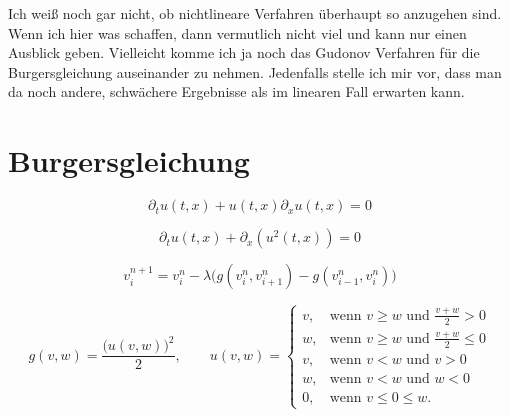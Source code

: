 Ich weiß noch gar nicht, ob nichtlineare Verfahren überhaupt so anzugehen sind.
Wenn ich hier was schaffen, dann vermutlich nicht viel und kann nur einen Ausblick geben.
Vielleicht komme ich ja noch das Gudonov Verfahren für die Burgersgleichung auseinander zu nehmen.
Jedenfalls stelle ich mir vor, dass man da noch andere, schwächere Ergebnisse als im linearen Fall erwarten kann.

\section{Burgersgleichung}

\[ \partial_t u(t, x) + u(t,x) \partial_x u(t,x) = 0 \]

\[ \partial_t u(t, x) + \partial_x \left(u^2(t,x) \right) = 0 \]

\[ v^{n+1}_i = v^n_i - \lambda \bigl( g(v^n_i, v^n_{i+1}) - g(v^n_{i-1}, v^n_i) \bigr) \]

\[
g(v,w) = \frac{\bigl(u(v,w)\bigr)^2}{2}, \qquad u(v,w) = \begin{cases}
v, & \text{wenn } v \geq w \text{ und } \frac{v+w}{2} > 0\\
w, & \text{wenn } v \geq w \text{ und } \frac{v+w}{2} \leq 0\\
v, & \text{wenn } v < w \text{ und } v > 0\\
w, & \text{wenn } v < w \text{ und } w < 0\\
0, & \text{wenn } v \leq 0 \leq w.
\end{cases}
\]